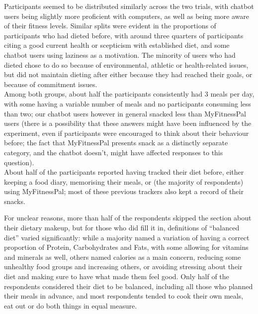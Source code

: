 Participants seemed to be distributed similarly across the two trials, with chatbot users being slightly more proficient with computers, as well as being more aware of their fitness levels. Similar splits were evident in the proportions of participants who had dieted before, with around three quarters of participants citing a good current health or scepticism with established diet, and some chatbot users using laziness as a motivation. The minority of users who had dieted chose to do so because of environmental, athletic or health-related issues, but did not maintain dieting after either because they had reached their goals, or because of commitment issues. \\
Among both groups, about half the participants consistently had 3 meals per day, with some having a variable number of meals and no participants consuming less than two; our chatbot users however in general snacked less than MyFitnessPal users (there is a possibility that these answers might have been influenced by the experiment, even if participants were encouraged to think about their behaviour before; the fact that MyFitnessPal presents snack as a distinctly separate category, and the chatbot doesn't, might have affected responses to this question). \\
About half of the participants reported having tracked their diet before, either keeping a food diary, memorising their meals, or (the majority of respondents) using MyFitnessPal; most of these previous trackers also kept a record of their snacks. 

For unclear reasons, more than half of the respondents skipped the section about their dietary makeup, but for those who did fill it in, definitions of ``balanced diet'' varied significantly: while a majority named a variation of having a correct proportion of Protein, Carbohydrates and Fats, with some allowing for vitamins and minerals as well, others named calories as a main concern, reducing some unhealthy food groups and increasing others, or avoiding stressing about their diet and making sure to have what made them feel good. Only half of the respondents considered their diet to be balanced, including all those who planned their meals in advance, and most respondents tended to cook their own meals, eat out or do both things in equal measure.

